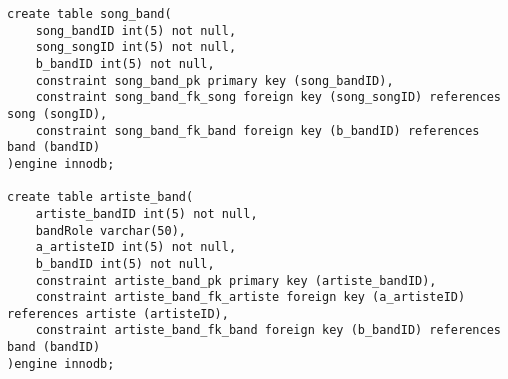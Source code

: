 \documentclass[12pt]{article}
\begin{document}
\begin{lstlisting}
create table song_band(
    song_bandID int(5) not null,
    song_songID int(5) not null,
    b_bandID int(5) not null,
    constraint song_band_pk primary key (song_bandID),
    constraint song_band_fk_song foreign key (song_songID) references song (songID),
    constraint song_band_fk_band foreign key (b_bandID) references band (bandID)
)engine innodb;

create table artiste_band(
    artiste_bandID int(5) not null,
    bandRole varchar(50),
    a_artisteID int(5) not null,
    b_bandID int(5) not null,
    constraint artiste_band_pk primary key (artiste_bandID),
    constraint artiste_band_fk_artiste foreign key (a_artisteID) references artiste (artisteID),
    constraint artiste_band_fk_band foreign key (b_bandID) references band (bandID)
)engine innodb;
\end{lstlisting}
\end{document}
